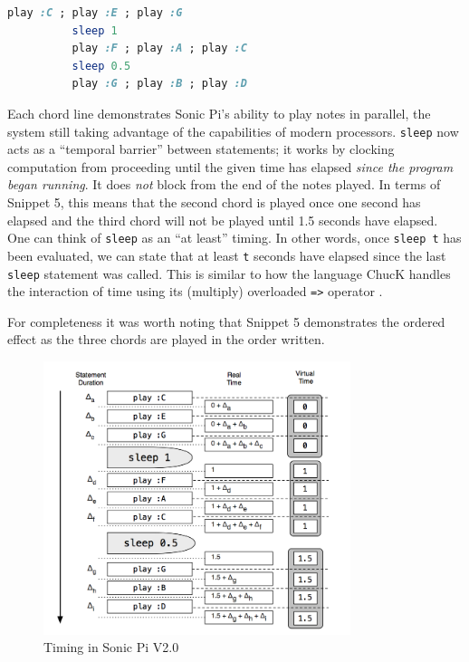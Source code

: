\documentclass[11pt]{scrartcl}
\begin{document}
\begin{minipage}{\textwidth}
	\begin{lstlisting}[language = ruby]
		  play :C ; play :E ; play :G
		  sleep 1
		  play :F ; play :A ; play :C
		  sleep 0.5
		  play :G ; play :B ; play :D
	\end{lstlisting}
\end{minipage}

Each chord line demonstrates Sonic Pi's ability to play notes in parallel, the 
system still taking advantage of the capabilities of modern processors. \texttt
{sleep} now acts as a ``temporal barrier'' between statements; it works by 
clocking computation from proceeding until the given time has elapsed \emph{
since the program began running}. It does \emph{not} block from the end of the 
notes played. In terms of Snippet 5, this means that the second chord is 
played once one second has elapsed and the third chord will not be played 
until 1.5 seconds have elapsed. One can think of \texttt{sleep} as an ``at 
least'' timing. In other words, once \texttt{sleep t} has been evaluated, we 
can state that at least \texttt{t} seconds have elapsed since the last \texttt{
sleep} statement was called. This is similar to how the language ChucK handles 
the interaction of time using its (multiply) overloaded \texttt{=>} operator 
\cite{WC03}.

For completeness it was worth noting that Snippet 5 demonstrates the ordered 
effect as the three chords are played in the order written.

\begin{figure}[ht]
	\centering
	\includegraphics[width=0.8\textwidth]{images/sonic-two.png}
	\caption{Timing in Sonic Pi V2.0}
\end{figure}
\end{document}
